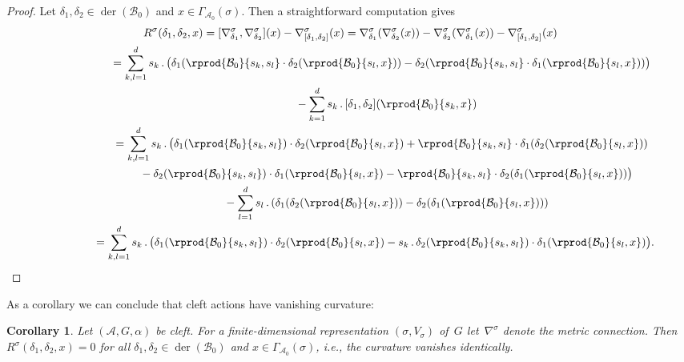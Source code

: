 \documentclass[pdftex]{sigma}
\numberwithin{equation}{section}
\newtheorem{Corollary}[Theorem]{Corollary}
\DeclareMathOperator{\der}{der}
\newcommand*{\acts}{\,.\,}
\newcommand*{\alg}{\mathcal}		%
\newcommand*{\aA}{\alg{A}}			%
\newcommand*{\aB}{\alg{B}} 			%
\begin{document}
\begin{proof}
	Let $\delta_1,\delta_2 \in \der(\aB_0)$ and $x \in \Gamma_{\aA_0}(\sigma)$. Then a straightforward computation gives
	\begin{gather*}
 R^\sigma(\delta_1,\delta_2,x) = [ \nabla_{\delta_1}^\sigma,\nabla_{\delta_2}^\sigma ] (x) - \nabla_{ [\delta_1,\delta_2] }^\sigma (x) = \nabla_{\delta_1}^\sigma ( \nabla_{\delta_2}^\sigma(x) ) - \nabla_{\delta_2}^\sigma ( \nabla_{\delta_1}^\sigma(x) ) - \nabla_{ [\delta_1,\delta_2] }^\sigma (x)
		\\
\hphantom{R^\sigma(\delta_1,\delta_2,x)}{} = \sum_{k,l=1}^d s_k \acts \big( \delta_1 ( \rprod{\aB_0}{s_k,s_l} \cdot \delta_2 ( \rprod{\aB_0}{s_l,x} ) ) - \delta_2 ( \rprod{\aB_0}{s_k,s_l} \cdot \delta_1 ( \rprod{\aB_0}{s_l,x} ) ) \big)
		\\
\hphantom{R^\sigma(\delta_1,\delta_2,x)=}{} - \sum_{k=1}^d s_k \acts [\delta_1,\delta_2] ( \rprod{\aB_0}{s_k,x})
		\\
\hphantom{R^\sigma(\delta_1,\delta_2,x)}{}
 = \sum_{k,l=1}^d s_k \acts \bigl( \delta_1 ( \rprod{\aB_0}{s_k,s_l} ) \cdot \delta_2 ( \rprod{\aB_0}{s_l,x}) + \rprod{\aB_0}{s_k,s_l} \cdot \delta_1( \delta_2 ( \rprod{\aB_0}{s_l,x} ))
		\\			
\hphantom{R^\sigma(\delta_1,\delta_2,x)=}{} - \delta_2 ( \rprod{\aB_0}{s_k,s_l} ) \cdot \delta_1 ( \rprod{\aB_0}{s_l,x} ) - \rprod{\aB_0}{s_k,s_l} \cdot \delta_2 ( \delta_1 ( \rprod{\aB_0}{s_l,x} ) ) \bigr)
		\\
\hphantom{R^\sigma(\delta_1,\delta_2,x)=}{} - \sum_{l=1}^d s_l \acts ( \delta_1 ( \delta_2 ( \rprod{\aB_0}{s_l,x} ) ) - \delta_2 ( \delta_1 ( \rprod{\aB_0}{s_l,x} ) ) )
		\\
 \hphantom{R^\sigma(\delta_1,\delta_2,x)}{}
 = \sum_{k,l=1}^d s_k \acts \bigl( \delta_1 ( \rprod{\aB_0}{s_k,s_l} ) \cdot \delta_2 ( \rprod{\aB_0}{s_l,x} ) - s_k \acts \delta_2 ( \rprod{\aB_0}{s_k,s_l} ) \cdot \delta_1 ( \rprod{\aB_0}{s_l,x} ) \bigr).
		\!\!\!\!\!\tag*{\qed}
	\end{gather*}
	\renewcommand{\qed}{}
\end{proof}

As a corollary we can conclude that cleft actions have vanishing curvature:

\begin{Corollary}\label{cor:cur0}
Let $(\aA,G,\alpha)$ be cleft. For a finite-dimensional representation $(\sigma,V_\sigma)$ of~$G$ let~$\nabla^\sigma$ denote the metric connection. Then $R^\sigma(\delta_1,\delta_2,x) = 0$ for all $\delta_1,\delta_2 \in \der(\aB_0)$ and $x \in \Gamma_{\aA_0}(\sigma)$, i.e., the curvature vanishes identically.
\end{Corollary}
\end{document}
